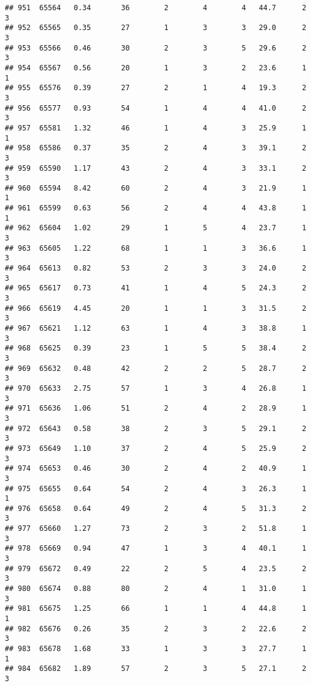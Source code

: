 \documentclass[
]{article}
\begin{document}
\begin{verbatim}
## 951  65564   0.34       36        2        4        4   44.7      2      3
## 952  65565   0.35       27        1        3        3   29.0      2      3
## 953  65566   0.46       30        2        3        5   29.6      2      3
## 954  65567   0.56       20        1        3        2   23.6      1      1
## 955  65576   0.39       27        2        1        4   19.3      2      3
## 956  65577   0.93       54        1        4        4   41.0      2      3
## 957  65581   1.32       46        1        4        3   25.9      1      1
## 958  65586   0.37       35        2        4        3   39.1      2      3
## 959  65590   1.17       43        2        4        3   33.1      2      3
## 960  65594   8.42       60        2        4        3   21.9      1      1
## 961  65599   0.63       56        2        4        4   43.8      1      1
## 962  65604   1.02       29        1        5        4   23.7      1      3
## 963  65605   1.22       68        1        1        3   36.6      1      3
## 964  65613   0.82       53        2        3        3   24.0      2      3
## 965  65617   0.73       41        1        4        5   24.3      2      3
## 966  65619   4.45       20        1        1        3   31.5      2      3
## 967  65621   1.12       63        1        4        3   38.8      1      3
## 968  65625   0.39       23        1        5        5   38.4      2      3
## 969  65632   0.48       42        2        2        5   28.7      2      3
## 970  65633   2.75       57        1        3        4   26.8      1      3
## 971  65636   1.06       51        2        4        2   28.9      1      3
## 972  65643   0.58       38        2        3        5   29.1      2      3
## 973  65649   1.10       37        2        4        5   25.9      2      3
## 974  65653   0.46       30        2        4        2   40.9      1      3
## 975  65655   0.64       54        2        4        3   26.3      1      1
## 976  65658   0.64       49        2        4        5   31.3      2      3
## 977  65660   1.27       73        2        3        2   51.8      1      3
## 978  65669   0.94       47        1        3        4   40.1      1      3
## 979  65672   0.49       22        2        5        4   23.5      2      3
## 980  65674   0.88       80        2        4        1   31.0      1      3
## 981  65675   1.25       66        1        1        4   44.8      1      1
## 982  65676   0.26       35        2        3        2   22.6      2      3
## 983  65678   1.68       33        1        3        3   27.7      1      1
## 984  65682   1.89       57        2        3        5   27.1      2      3

\end{verbatim}
\end{document}
